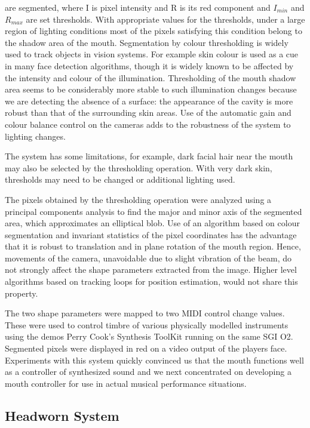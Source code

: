 are segmented, where I is pixel intensity and R is its red component and $I_{min}$ and $R_{max}$ are set thresholds. With appropriate values for the thresholds, under a large region of lighting conditions most of the pixels satisfying this condition belong to the shadow area of the mouth. Segmentation by colour thresholding is widely used to track objects in vision systems. For example skin colour is used as a cue in many face detection algorithms, though it is widely known to be affected by the intensity and colour of the illumination. Thresholding of the mouth shadow area seems to be considerably more stable to such illumination changes because we are detecting the absence of a surface: the appearance of the cavity is more robust than that of the surrounding skin areas. Use of the automatic gain and colour balance control on the cameras adds to the robustness of the system to lighting changes.

The system has some limitations, for example, dark facial hair near the mouth may also be selected by the thresholding operation. With very dark skin, thresholds may need to be changed or additional lighting used.

The pixels obtained by the thresholding operation were analyzed using a principal components analysis \cite{Duda:1973} to find the major and minor axis of the segmented area, which approximates an elliptical blob. Use of an algorithm based on colour segmentation and invariant statistics of the pixel coordinates has the advantage that it is robust to translation and in plane rotation of the mouth region. Hence, movements of the camera, unavoidable due to slight vibration of the beam, do not strongly affect the shape parameters extracted from the image. Higher level algorithms based on tracking loops for position estimation, would not share this property. 

The two shape parameters were mapped to two MIDI control change values. These were used to control timbre of various physically modelled instruments using the demos Perry Cook's Synthesis ToolKit \cite{Cook:1999a} running on the same SGI O2. Segmented pixels were displayed in red on a video output of the players face. Experiments with this system quickly convinced us that the mouth functions well as a controller of synthesized sound and we next concentrated on developing a mouth controller for use in actual musical performance situations.

\subsection{Headworn System}

